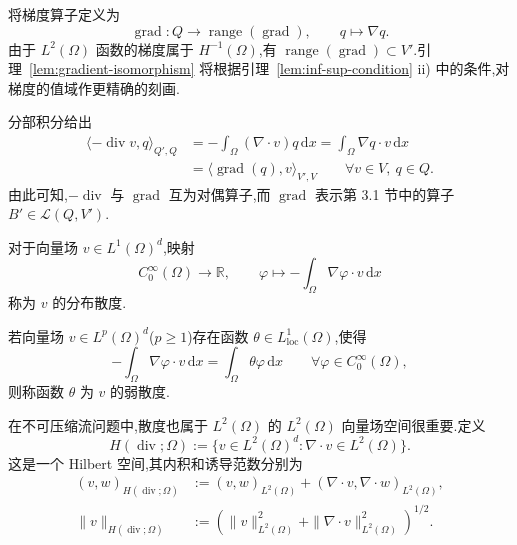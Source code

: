 \begin{note}[梯度算子]\label{note:gradient-operator}
将梯度算子定义为
\[
  \operatorname{grad}:Q\longrightarrow\operatorname{range}(\operatorname{grad}),
  \qquad q\longmapsto\nabla q.
\]
由于 $L^2(\Omega)$ 函数的梯度属于 $H^{-1}(\Omega)$,有 $\operatorname{range}(\operatorname{grad})\subset V'$.引理~\ref{lem:gradient-isomorphism} 将根据引理~\ref{lem:inf-sup-condition} ii) 中的条件,对梯度的值域作更精确的刻画.

分部积分给出
\begin{equation}\label{eq:divergence-gradient-duality}
\begin{aligned}
  \langle-\operatorname{div}v,q\rangle_{Q',Q}
    &=-\int_\Omega (\nabla\cdot v)q\,\mathrm{d}x
      =\int_\Omega \nabla q\cdot v\,\mathrm{d}x\\
    &=\langle\operatorname{grad}(q),v\rangle_{V',V}
      \qquad\forall v\in V,\ q\in Q.
\end{aligned}
\end{equation}
由此可知,$-\operatorname{div}$ 与 $\operatorname{grad}$ 互为对偶算子,而 $\operatorname{grad}$ 表示第 3.1 节中的算子 $B'\in\mathcal{L}(Q,V')$.
\end{note}

\begin{definition}[分布散度与弱散度]\label{def:distributional-weak-divergence}
对于向量场 $v\in L^1(\Omega)^d$,映射
\[
  C_0^\infty(\Omega)\longrightarrow\mathbb{R},
  \qquad \varphi\longmapsto-\int_\Omega \nabla\varphi\cdot v\,\mathrm{d}x
\]
称为 $v$ 的分布散度.

若向量场 $v\in L^p(\Omega)^d$($p\ge1$)存在函数 $\theta\in L^1_{\mathrm{loc}}(\Omega)$,使得
\[
  -\int_\Omega \nabla\varphi\cdot v\,\mathrm{d}x
    =\int_\Omega\theta\varphi\,\mathrm{d}x
    \qquad\forall\varphi\in C_0^\infty(\Omega),
\]
则称函数 $\theta$ 为 $v$ 的弱散度.
\end{definition}

\begin{note}[具有弱散度的函数空间]\label{note:weak-divergence-space}
在不可压缩流问题中,散度也属于 $L^2(\Omega)$ 的 $L^2(\Omega)$ 向量场空间很重要.定义
\begin{equation}\label{eq:hdiv-space}
  H(\operatorname{div};\Omega)
  :=\{v\in L^2(\Omega)^d:\nabla\cdot v\in L^2(\Omega)\}.
\end{equation}
这是一个 Hilbert 空间,其内积和诱导范数分别为
\[
  \begin{aligned}
    (v,w)_{H(\operatorname{div};\Omega)}
      &:=(v,w)_{L^2(\Omega)}
        +(\nabla\cdot v,\nabla\cdot w)_{L^2(\Omega)},\\
    \|v\|_{H(\operatorname{div};\Omega)}
      &:=\left(\|v\|_{L^2(\Omega)}^2
          +\|\nabla\cdot v\|_{L^2(\Omega)}^2\right)^{1/2}.
  \end{aligned}
\]
\end{note}

